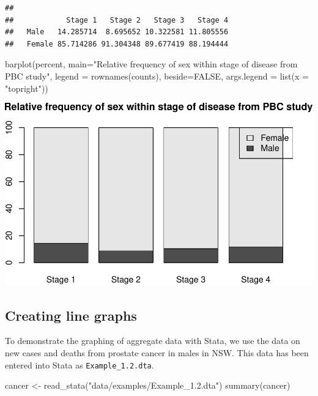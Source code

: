 \documentclass[
]{memoir}
\newenvironment{Shaded}{\begin{snugshade}}{\end{snugshade}}
\newcommand{\AttributeTok}[1]{\textcolor[rgb]{0.77,0.63,0.00}{#1}}
\newcommand{\ConstantTok}[1]{\textcolor[rgb]{0.00,0.00,0.00}{#1}}
\newcommand{\FunctionTok}[1]{\textcolor[rgb]{0.00,0.00,0.00}{#1}}
\newcommand{\NormalTok}[1]{#1}
\newcommand{\OtherTok}[1]{\textcolor[rgb]{0.56,0.35,0.01}{#1}}
\newcommand{\StringTok}[1]{\textcolor[rgb]{0.31,0.60,0.02}{#1}}
\begin{document}
\begin{verbatim}
##         
##            Stage 1   Stage 2   Stage 3   Stage 4
##   Male   14.285714  8.695652 10.322581 11.805556
##   Female 85.714286 91.304348 89.677419 88.194444
\end{verbatim}

\begin{Shaded}
\begin{Highlighting}[]
\FunctionTok{barplot}\NormalTok{(percent, }\AttributeTok{main=}\StringTok{"Relative frequency of sex within stage of disease from PBC study"}\NormalTok{,}
        \AttributeTok{legend =} \FunctionTok{rownames}\NormalTok{(counts), }\AttributeTok{beside=}\ConstantTok{FALSE}\NormalTok{, }\AttributeTok{args.legend =} \FunctionTok{list}\NormalTok{(}\AttributeTok{x =} \StringTok{"topright"}\NormalTok{))}
\end{Highlighting}
\end{Shaded}

\includegraphics{phcm9795-R-notes_files/figure-latex/unnamed-chunk-37-1.pdf}

\hypertarget{creating-line-graphs}{%
\subsection{Creating line graphs}\label{creating-line-graphs}}

To demonstrate the graphing of aggregate data with Stata, we use the data on new cases and deaths from prostate cancer in males in NSW. This data has been entered into Stata as \texttt{Example\_1.2.dta}.

\begin{Shaded}
\begin{Highlighting}[]
\NormalTok{cancer }\OtherTok{\textless{}{-}} \FunctionTok{read\_stata}\NormalTok{(}\StringTok{"data/examples/Example\_1.2.dta"}\NormalTok{)}
\FunctionTok{summary}\NormalTok{(cancer)}
\end{Highlighting}
\end{Shaded}
\end{document}
